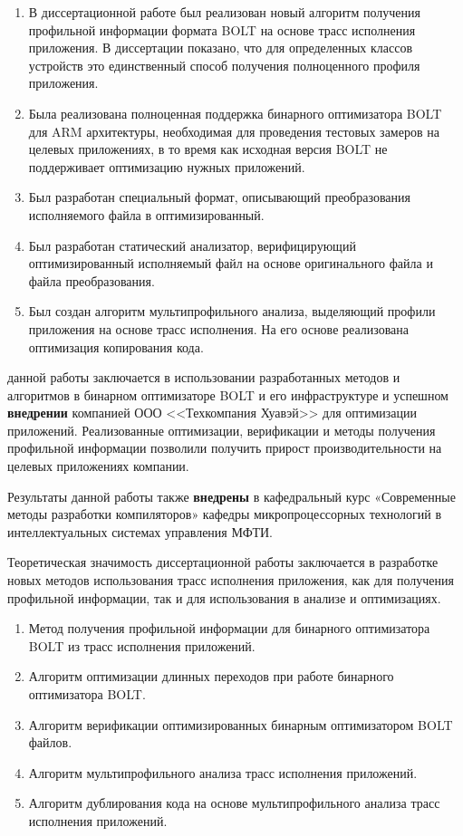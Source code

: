 {\novelty}
\begin{enumerate}[beginpenalty=10000] %
  \item В диссертационной работе был реализован новый алгоритм получения профильной информации формата BOLT на основе трасс исполнения приложения. В диссертации показано, что для определенных классов устройств это единственный способ получения полноценного профиля приложения.
  \item Была реализована полноценная поддержка бинарного оптимизатора BOLT для ARM архитектуры, необходимая для проведения тестовых замеров на целевых приложениях, в то время как исходная версия BOLT не поддерживает оптимизацию нужных приложений.
  \item Был разработан специальный формат, описывающий преобразования исполняемого файла в оптимизированный.
  \item Был разработан статический анализатор, верифицирующий оптимизированный исполняемый файл на основе оригинального файла и файла преобразования.
  \item Был создан алгоритм мультипрофильного анализа, выделяющий профили приложения на основе трасс исполнения. На его основе реализована оптимизация копирования кода.

\end{enumerate}

{\influence} данной работы заключается в использовании разработанных методов и алгоритмов в бинарном оптимизаторе BOLT и его инфраструктуре и успешном \textbf{внедрении} компанией ООО <<Техкомпания Хуавэй>> для оптимизации приложений. Реализованные оптимизации, верификации и методы получения профильной информации позволили получить прирост производительности на целевых приложениях компании.

Результаты данной работы также \textbf{внедрены} в кафедральный курс «Современные методы разработки компиляторов» кафедры микропроцессорных технологий в интеллектуальных системах управления МФТИ.

Теоретическая значимость диссертационной работы заключается в разработке новых методов использования трасс исполнения приложения, как для получения профильной информации, так и для использования в анализе и оптимизациях.

{}
\begin{enumerate}[beginpenalty=10000] %
  \item Метод получения профильной информации для бинарного оптимизатора BOLT из трасс исполнения приложений.
  \item Алгоритм оптимизации длинных переходов при работе бинарного оптимизатора BOLT.
  \item Алгоритм верификации оптимизированных бинарным оптимизатором BOLT файлов.
  \item Алгоритм мультипрофильного анализа трасс исполнения приложений.
  \item Алгоритм дублирования кода на основе мультипрофильного анализа трасс исполнения приложений.
\end{enumerate}

